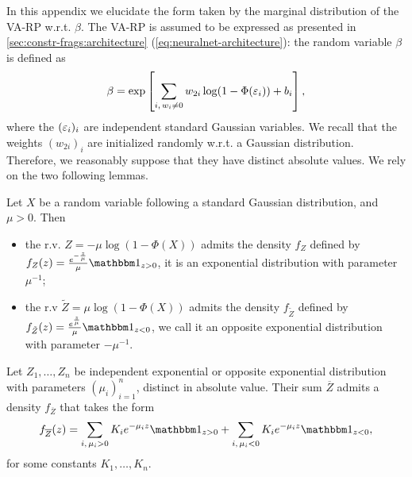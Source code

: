 In this appendix we elucidate the form taken by the marginal distribution of the VA-RP w.r.t. $\beta$.
The VA-RP is assumed to be expressed as presented in \cref{sec:constr-frags:architecture} (\cref{eq:neuralnet-architecture}): the random variable $\beta$ is defined as
    \begin{equation}\label{eq:app-expr-beta}
        \beta = \exp\left[\sum_{i,\,w_i\ne0}w_{2i}\log(1-\Phi(\varepsilon_i)) + b_i\right],
    \end{equation}
where the $(\varepsilon_i)_i$ are independent standard Gaussian variables.
We recall that the weights $(w_{2i})_{i}$ are initialized randomly w.r.t. a Gaussian distribution. Therefore, we reasonably suppose that they have distinct absolute values.
We rely on the two following lemmas.
\begin{lem}\label{lemma:expon-distrib}
    Let $X$ be a random variable following a standard Gaussian distribution, and $\mu>0$. Then
    \begin{itemize}
        \item the r.v. $Z=-\mu\log(1-\Phi(X))$ admits the density $f_Z$ defined by $f_Z(z)=\frac{e^{-\frac{z}{\mu}}}{\mu}\indic_{z>0}$, it is an exponential distribution with parameter $\mu^{-1}$;
        \item the r.v $\tilde Z=\mu\log(1-\Phi(X))$ admits the density $f_{\tilde Z}$ defined by $f_{\tilde Z}(z)= \frac{e^{\frac{z}{\mu}}}{\mu}\indic_{z<0}$, we call it an opposite exponential distribution with parameter $-\mu^{-1}$.
    \end{itemize}
\end{lem}
\begin{lem}\label{lemma:sum-of-expon}
    Let $Z_1,\dots,Z_n$ be independent exponential or opposite exponential distribution with parameters $(\mu_{i})_{i=1}^n$, distinct in absolute value. Their sum $\overline{Z}$ admits a density $f_{\overline{Z}}$ that takes the form
        \begin{equation}\label{eq:lem-pdf-Z}
            f_{\overline{Z}}(z) = \sum_{i,\,\mu_i>0}K_ie^{-\mu_i z}\indic_{z>0} + \sum_{i,\,\mu_i<0}K_ie^{-\mu_iz}\indic_{z<0},
        \end{equation}
    for some constants $K_1,\dots,K_n$.
\end{lem}


